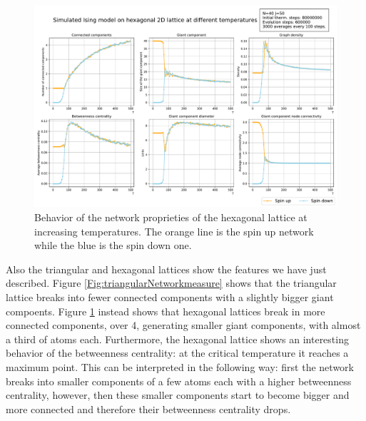 \begin{figure}[!htb]
  \includegraphics[width=.96\linewidth]{Network meausres/Hexagonal_Network.pdf}
    \caption{Behavior of the network proprieties of the hexagonal lattice at increasing temperatures. The orange line is the spin up network while the blue is the spin down one.}
    \label{Fig:hexagonalNetworkmeasure}
\end{figure}

Also the triangular and hexagonal lattices show the features we have just described. Figure \ref{Fig:triangularNetworkmeasure} shows that the triangular lattice breaks into fewer connected components with a slightly bigger giant compoents. Figure \ref{Fig:hexagonalNetworkmeasure} instead shows that hexagonal lattices break in more connected components, over 4, generating smaller giant components, with almost a third of atoms each. Furthermore, the hexagonal lattice shows an interesting behavior of the betweenness centrality: at the critical temperature it reaches a maximum point. This can be interpreted in the following way: first the network breaks into smaller components of a few atoms each with a higher betweenness centrality, however, then these smaller components start to become bigger and more connected and therefore their betweenness centrality drops.

